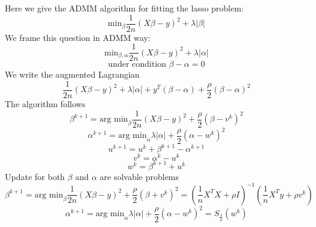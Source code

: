 \documentclass{article}
\begin{document}
Here we give the ADMM algorithm for fitting the lasso problem:
\[
\textrm{min}_\beta \frac{1}{2n}(X\beta-y)^2+\lambda|\beta| 
\]
We frame this question in ADMM way:
\[
\textrm{min}_{\beta,\alpha}\frac{1}{2n}(X\beta-y)^2+\lambda|\alpha|
\]
\[
\textrm{under condition    } \beta-\alpha=0
\]
We write the augmented Lagrangian
\[
\frac{1}{2n}(X\beta-y)^2+\lambda|\alpha|+y^T(\beta-\alpha)+\frac{\rho}{2}(\beta-\alpha)^2
\]
The algorithm follows
\[
\beta^{k+1}=\textrm{arg min}_\beta \frac{1}{2n}(X\beta-y)^2+\frac{\rho}{2}(\beta-v^k)^2
\]
\[
\alpha^{k+1}=\textrm{arg min}_\alpha \lambda|\alpha|+\frac{\rho}{2}(\alpha-w^k)^2
\]
\[
u^{k+1}=u^k+\beta^{k+1}-\alpha^{k+1}
\]
\[
v^k=\alpha^k-u^k
\]
\[
w^k=\beta^{k+1}+u^k
\]
Update for both $\beta$ and $\alpha$ are solvable problems
\[
\beta^{k+1}=\textrm{arg min}_\beta \frac{1}{2n}(X\beta-y)^2+\frac{\rho}{2}(\beta+v^k)^2=(\frac{1}{n}X^TX+\rho I)^{-1}(\frac{1}{n}X^Ty+\rho v^k)
\]
\[
\alpha^{k+1}=\textrm{arg min}_\alpha \lambda|\alpha|+\frac{\rho}{2}(\alpha-w^k)^2=S_{\frac{\lambda}{\rho}}(w^k)
\]
\end{document}
